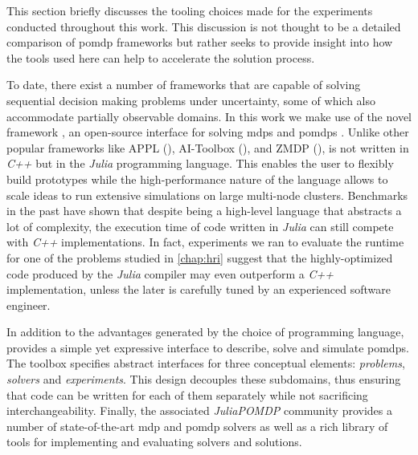 This section briefly discusses the tooling choices made for the experiments
conducted throughout this work. This discussion is not thought to be a detailed
comparison of \ac{pomdp} frameworks but rather seeks to provide insight into
how the tools used here can help to accelerate the solution process.

To date, there exist a number of frameworks that are capable of solving
sequential decision making problems under uncertainty, some of which also
accommodate partially observable domains. In this work we make use of the novel
framework \pomdpsjl, an open-source interface for solving \acp{mdp} and
\acp{pomdp} \cite{egorov2017pomdps}. Unlike other popular frameworks like APPL
(\cite{appl}), AI-Toolbox (\cite{aitoolbox}), and ZMDP (\cite{zmdp}), \pomdpsjl
is not written in \emph{C++} but in the \emph{Julia} programming language. This
enables the user to flexibly build prototypes while the high-performance nature
of the language allows to scale ideas to run extensive simulations on large
multi-node clusters. Benchmarks in the past have shown that despite being
a high-level language that abstracts a lot of complexity, the execution time of
code written in \emph{Julia} can still compete with \emph{C++} implementations.
In fact, experiments we ran to evaluate the runtime for one of the problems
studied in \cref{chap:hri} suggest that the highly-optimized code produced by
the \emph{Julia} compiler may even outperform a \emph{C++} implementation,
unless the later is carefully tuned by an experienced software engineer.

In addition to the advantages generated by the choice of programming language,
\pomdpsjl provides a simple yet expressive interface to describe, solve and
simulate \acp{pomdp}. The toolbox specifies abstract interfaces for three
conceptual elements: \emph{problems}, \emph{solvers} and \emph{experiments}.
This design decouples these subdomains, thus ensuring that code can be written
for each of them separately while not sacrificing interchangeability. Finally,
the associated \emph{JuliaPOMDP} community provides a number of
state-of-the-art \ac{mdp} and \ac{pomdp} solvers as well as a rich library of
tools for implementing and evaluating solvers and solutions.
